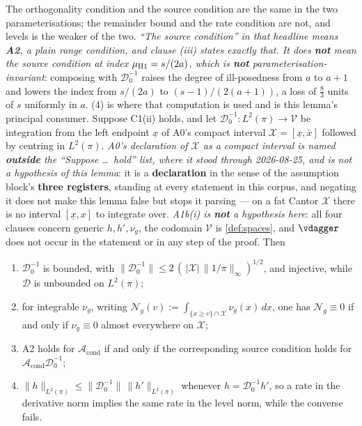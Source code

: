 \begin{lemma}\label{lem:levels}
The orthogonality condition and the source condition are the same in the two parameterisations; the
remainder bound and the rate condition are not, and levels is the weaker of the two.
\emph{``The source condition'' in that headline means \textbf{A2}, a plain range condition, and clause
\textup{(iii)} states exactly that. It does \textbf{not} mean the source condition \emph{at index
$\mu_{\text{\textup{H1}}}=s/(2a)$},
which is \textbf{not} parameterisation-invariant}: composing with $\mathcal D^{-1}_0$ raises the degree of
ill-posedness from $a$ to $a+1$ and lowers the index from $s/(2a)$ to $(s-1)/(2(a+1))$, a loss of
$\tfrac83$ units of $s$ uniformly in $a$. \textup{(4)} is where that computation is used
and is this lemma's principal consumer.
Suppose C1(ii) holds, and let
$\mathcal D^{-1}_0:L^{2}(\pi)\to\mathcal V$ be integration from the left endpoint $\underline x$ of
A0's compact interval $\mathcal X=[\underline x,\bar x]$ followed by centring in $L^{2}(\pi)$.
\emph{A0's declaration of $\mathcal X$ as a compact interval is named \textbf{outside} the
``Suppose \dots\ hold'' list, where it stood through 2026-08-25, and is not a hypothesis of this
lemma}: it is a \textbf{declaration} in the sense of the assumption block's \textbf{three registers},
standing at every statement in this corpus, and negating it does not make this lemma false but stops
it parsing --- on a fat Cantor $\mathcal X$ there is no interval $[\underline x,x]$ to integrate over.
\emph{A1b(i) is \textbf{not} a hypothesis here}: all
four clauses concern generic $h,h',\nu_g$, the codomain $\mathcal V$ is \cref{def:spaces}, and
$\vdagger$ does not occur in the statement or in any step of the proof. Then
\begin{enumerate}
\item[(i)] $\mathcal D^{-1}_0$ is bounded, with
$\|\mathcal D^{-1}_0\|\le2\,(\,|\mathcal X|\,\|1/\pi\|_\infty)^{1/2}$, and injective, while
$\mathcal D$ is unbounded on $L^{2}(\pi)$;
\item[(ii)] for integrable $\nu_g$, writing $\mathcal N_g(v):=\int_{\{x\ge v\}\cap\mathcal X}\nu_g(x)\,dx$,
one has $\mathcal N_g\equiv0$ if and only if $\nu_g\equiv0$ almost everywhere on $\mathcal X$;
\item[(iii)] A2 holds for $\mathcal A_{\mathrm{cond}}$ if and only if the corresponding source condition
holds for $\mathcal A_{\mathrm{cond}}\mathcal D^{-1}_0$;
\item[(iv)] $\|h\|_{L^{2}(\pi)}\le\|\mathcal D^{-1}_0\|\,\|h'\|_{L^{2}(\pi)}$ whenever
$h=\mathcal D^{-1}_0h'$, so a rate in the derivative norm implies the same rate in the level norm, while
the converse fails.
\end{enumerate}
\end{lemma}

